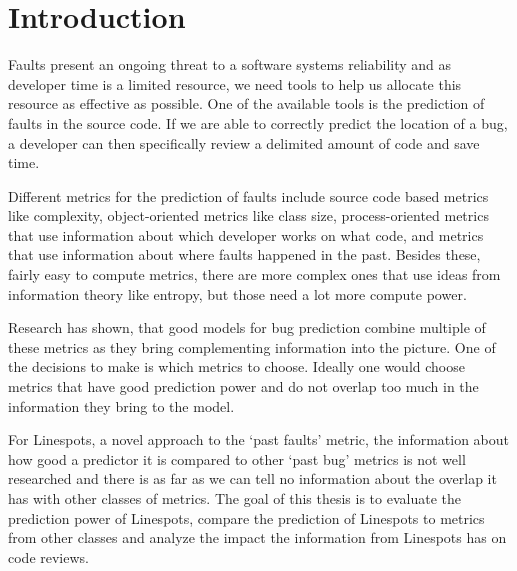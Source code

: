 \section{Introduction}
Faults present an ongoing threat to a software systems reliability and as developer time is a limited resource, we need tools to help us allocate this resource as effective as possible. One of the available tools is the prediction of faults in the source code. If we are able to correctly predict the location of a bug, a developer can then specifically review a delimited amount of code and save time.

Different metrics for the prediction of faults include source code based metrics like complexity, object-oriented metrics like class size, process-oriented metrics that use information about which developer works on what code, and metrics that use information about where faults happened in the past. Besides these, fairly easy to compute metrics, there are more complex ones that use ideas from information theory like entropy, but those need a lot more compute power.%

Research has shown, that good models for bug prediction combine multiple of these metrics as they bring complementing information into the picture. One of the decisions to make is which metrics to choose. Ideally one would choose metrics that have good prediction power and do not overlap too much in the information they bring to the model.

For Linespots, a novel approach to the `past faults' metric, the information about how good a predictor it is compared to other `past bug' metrics is not well researched and there is as far as we can tell no information about the overlap it has with other classes of metrics. The goal of this thesis is to evaluate the prediction power of Linespots, compare the prediction of Linespots to metrics from other classes and analyze the impact the information from Linespots has on code reviews.
